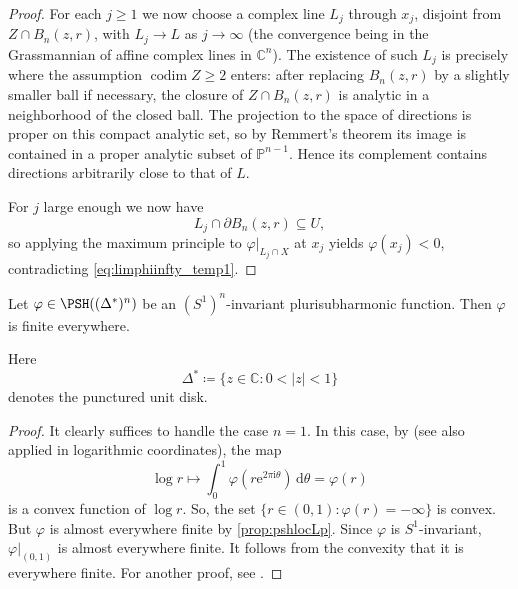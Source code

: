 \begin{proof}
    For each $j\geq 1$ we now choose a complex line $L_j$ through $x_j$, disjoint from $Z\cap B_n(z,r)$, with $L_j\to L$ as $j\to\infty$ (the convergence being in the Grassmannian of affine complex lines in $\mathbb{C}^n$). The existence of such $L_j$ is precisely where the assumption $\operatorname{codim} Z\geq 2$ enters: after replacing $B_n(z,r)$ by a slightly smaller ball if necessary, the closure of $Z\cap B_n(z,r)$ is analytic in a neighborhood of the closed ball. The projection to the space of directions is proper on this compact analytic set, so by Remmert's theorem its image is contained in a proper analytic subset of $\mathbb{P}^{n-1}$. Hence its complement contains directions arbitrarily close to that of $L$.

    For $j$ large enough we now have
    \[
        L_j\cap \partial B_n(z,r)\subseteq U,
    \]
    so applying the maximum principle to $\varphi|_{L_j\cap X}$ at $x_j$ yields $\varphi(x_j)<0$, contradicting \eqref{eq:limphiinfty_temp1}.
\end{proof}



\begin{lemma}\label{lma:invariantpshfunfinite}
    Let $\varphi\in \PSH((\Delta^*)^n)$ be an $(S^1)^n$-invariant plurisubharmonic function. Then $\varphi$ is finite everywhere.
\end{lemma}
Here
\[
\Delta^*\coloneqq \{z\in \mathbb{C}: 0<|z|<1\}
\]
denotes the punctured unit disk.
\begin{proof}
    It clearly suffices to handle the case $n=1$. In this case, by \cite[Theorem~2.12]{HK76} (see also \cite[Proposition~18.1.5]{FPT} applied in logarithmic coordinates), the map
    \[
    \log r\mapsto \int_{0}^{1} \varphi\left(r\mathrm{e}^{2\pi\mathrm{i}\theta}\right)\,\mathrm{d}\theta=\varphi(r)
    \]
    is a convex function of $\log r$.
    So, the set $\{r\in (0,1): \varphi(r)=-\infty\}$ is convex.
    But $\varphi$ is almost everywhere finite by \cref{prop:pshlocLp}. Since $\varphi$ is $S^1$-invariant, $\varphi|_{(0,1)}$ is almost everywhere finite.
    It follows from the convexity that it is everywhere finite. For another proof, see \cite[Corollary~18.1.6]{FPT}.
\end{proof}




